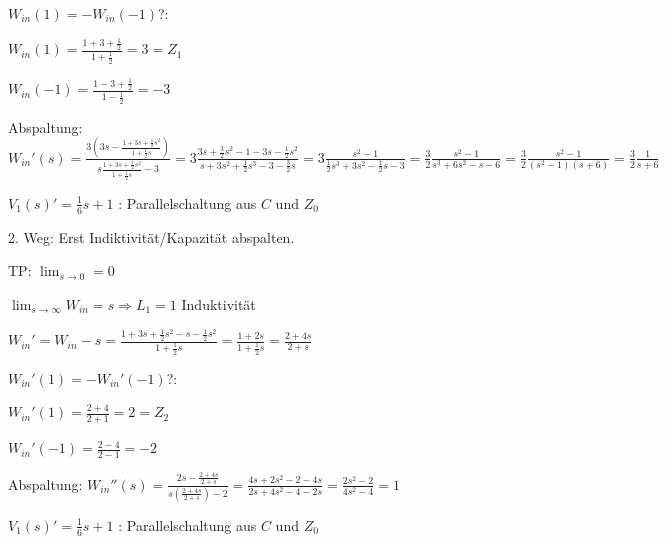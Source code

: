 \begin{penumerate}
    \item $W_{in}(1) = -W_{in}(-1)$?:
    \begin{pitemize}
        \item $W_{in}(1) = \frac{1 + 3 + \frac{1}{2}}{1 + \frac{1}{2}} = 3 = Z_1$
        \item $W_{in}(-1) = \frac{1 - 3 + \frac{1}{2}}{1 - \frac{1}{2}} = -3$
    \end{pitemize}
    \item Abspaltung: $W_{in}'(s) = \frac{3 (3s - \frac{1 + 3s + \frac{1}{2}s^2}{1 + \frac{1}{2}s})}{s\frac{1 + 3s + \frac{1}{2}s^2}{1 + \frac{1}{2}s} - 3} = 3\frac{3s + \frac{3}{2}s^2 - 1 - 3s - \frac{1}{2}s^2}{s + 3 s^2 + \frac{1}{2}s^3 - 3 - \frac{3}{2}s} = 3\frac{s^2 - 1}{\frac{1}{2}s^3 + 3s^2 - \frac{1}{2}s - 3} = \frac{3}{2}\frac{s^2 - 1}{s^3 + 6s^2 - s - 6} = \frac{3}{2} \frac{s^2 -1}{(s^2 - 1)(s + 6)} = \frac{3}{2} \frac{1}{s + 6}$
    \item $V_1(s)' = \frac{1}{6}s + 1$ : Parallelschaltung aus $C$ und $Z_0$ 
    \item \item {}
\end{penumerate}

2. Weg: Erst Indiktivität/Kapazität abspalten.
\begin{penumerate}
    \item TP: $\lim_{s\rightarrow0} = 0$
    \item $\lim_{s\rightarrow\infty} W_{in} = s \Rightarrow L_1 = 1$ Induktivität
    \item $W_{in}' = W_{in} - s = \frac{1 + 3s + \frac{1}{2}s^2 - s - \frac{1}{2}s^2}{1 + \frac{1}{2}s} = \frac{1 + 2s}{1 + \frac{1}{2}s} = \frac{2 + 4s}{2 + s}$ 
    \item $W_{in}'(1) = -W_{in}'(-1)$?:
    \begin{pitemize}
        \item $W_{in}'(1) = \frac{2 + 4}{2 +1} = 2 =Z_2$
        \item $W_{in}'(-1) =\frac{2 - 4}{2 -1} = -2$
    \end{pitemize}
    \item Abspaltung: $W_{in}''(s) = \frac{2s - \frac{2 + 4s}{2 + s}}{s(\frac{2 + 4s}{2 + s}) - 2} = \frac{4s + 2s^2 - 2 - 4s}{2s + 4s^2 - 4 -2s} = \frac{2s^2 - 2}{4s^2 - 4} = 1$
    \item $V_1(s)' = \frac{1}{6}s + 1$ : Parallelschaltung aus $C$ und $Z_0$ 
    \item {}
\end{penumerate}


